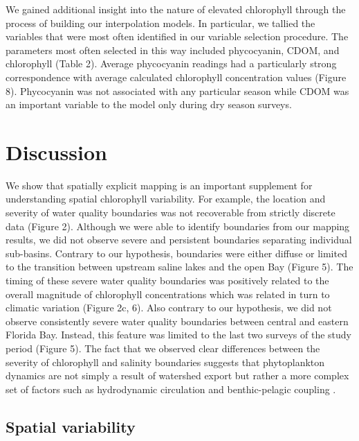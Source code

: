 We gained additional insight into the nature of elevated chlorophyll through the process of building our interpolation models. In particular, we tallied the variables that were most often identified in our variable selection procedure. The parameters most often selected in this way included phycocyanin, CDOM, and chlorophyll (Table 2). Average phycocyanin readings had a particularly strong correspondence with average calculated chlorophyll concentration values (Figure 8). Phycocyanin was not associated with any particular season while CDOM was an important variable to the model only during dry season surveys.

\section{Discussion}
\label{discussion}

We show that spatially explicit mapping is an important supplement for understanding spatial chlorophyll variability. For example, the location and severity of water quality boundaries was not recoverable from strictly discrete data (Figure 2). Although we were able to identify boundaries from our mapping results, we did not observe severe and persistent boundaries separating individual sub-basins. Contrary to our hypothesis, boundaries were either diffuse or limited to the transition between upstream saline lakes and the open Bay (Figure 5). The timing of these severe water quality boundaries was positively related to the overall magnitude of chlorophyll concentrations which was related in turn to climatic variation (Figure 2c, 6). Also contrary to our hypothesis, we did not observe consistently severe water quality boundaries between central and eastern Florida Bay. Instead, this feature was limited to the last two surveys of the study period (Figure 5). The fact that we observed clear differences between the severity of chlorophyll and salinity boundaries suggests that phytoplankton dynamics are not simply a result of watershed export but rather a more complex set of factors such as hydrodynamic circulation and benthic-pelagic coupling \citep[Figure 6, ][]{zhang_2014, lawrence2004wind}. 

\subsection{Spatial variability}
\label{spatialvariability}

